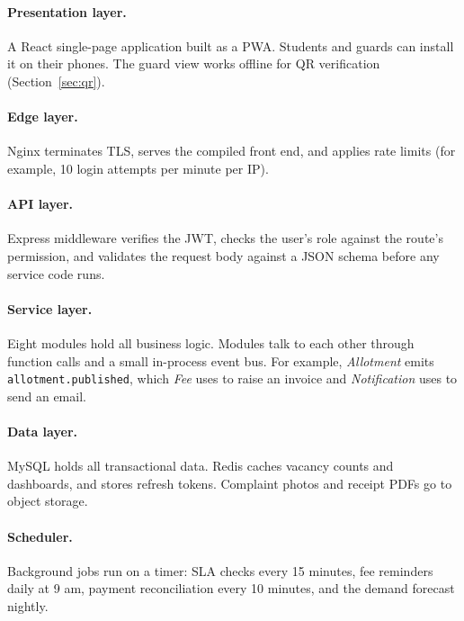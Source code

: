 \documentclass[11pt,a4paper]{report}
\begin{document}
\paragraph{Presentation layer.} A React single-page application built as a PWA. Students and guards can install it on their phones. The guard view works offline for QR verification (Section~\ref{sec:qr}).

\paragraph{Edge layer.} Nginx terminates TLS, serves the compiled front end, and applies rate limits (for example, 10 login attempts per minute per IP).

\paragraph{API layer.} Express middleware verifies the JWT, checks the user's role against the route's permission, and validates the request body against a JSON schema before any service code runs.

\paragraph{Service layer.} Eight modules hold all business logic. Modules talk to each other through function calls and a small in-process event bus. For example, \emph{Allotment} emits \texttt{allotment.published}, which \emph{Fee} uses to raise an invoice and \emph{Notification} uses to send an email.

\paragraph{Data layer.} MySQL holds all transactional data. Redis caches vacancy counts and dashboards, and stores refresh tokens. Complaint photos and receipt PDFs go to object storage.

\paragraph{Scheduler.} Background jobs run on a timer: SLA checks every 15 minutes, fee reminders daily at 9 am, payment reconciliation every 10 minutes, and the demand forecast nightly.
\end{document}
